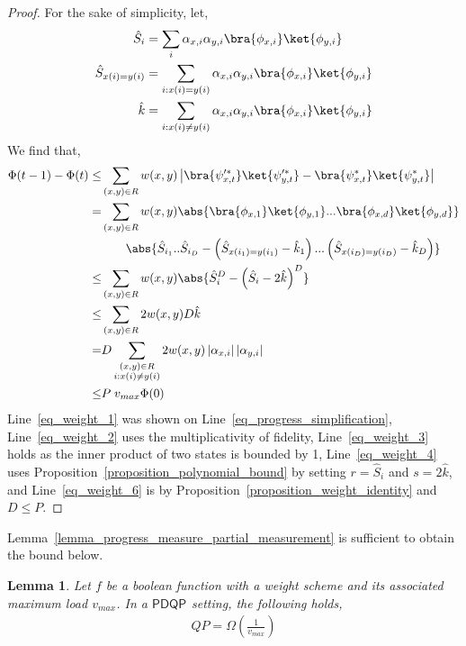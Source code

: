 \documentclass[10pt,a4paper]{article}
\newcommand{\abilityamount}[0]{\ensuremath{P}\xspace} %
\newcommand{\compclass}[2][]{\ensuremath{\mathsf{#2}^{#1}}\xspace}
\newcommand{\pdqpname}[0]{\compclass{PDQP}}
\newtheorem{lemma}[theorem]{Lemma}
\begin{document}
\begin{proof}
    For the sake of simplicity, let,
    \begin{align*}
        \hat{S}_i &= \sum_{i} \alpha_{x,i}\alpha_{y,i}\bra{\phi_{x,i}}\ket{\phi_{y,i}}\\
        \hat{S}_{x(i)=y(i)} &= \sum_{i:x(i)=y(i) } \alpha_{x,i}\alpha_{y,i}\bra{\phi_{x,i}}\ket{\phi_{y,i}}\\
        \hat{k} &= \sum_{i: x(i)\neq y(i)}\alpha_{x,i}\alpha_{y,i}\bra{\phi_{x,i}}\ket{\phi_{y,i}}
    \end{align*}
    We find that,
    \begin{align}
        \Phi(t-1) - \Phi(t) \leq 
        &\sum_{(x,y)\in R} w(x,y) \left| \bra{\psi_{x,t}^{\prime *}}\ket{\psi_{y,t}^{\prime *}} - \bra{\psi_{x,t}^*}\ket{\psi_{y,t}^*} \right|\label{eq_weight_1}\\
        = &\sum_{(x,y)\in R} w(x,y)\abs{\bra{\phi_{x,1}}\ket{\phi_{y,1}}...\bra{\phi_{x,d}}\ket{\phi_{y,d}}} \notag\\
        &\qquad\abs{ \hat{S}_{i_1}..\hat{S}_{i_D} - \left(\hat{S}_{x(i_1)=y(i_1)} - \hat{k}_1\right)...\left(\hat{S}_{x(i_D) = y(i_D)} - \hat{k}_D\right)} \label{eq_weight_2}\\
        \leq &\sum_{(x,y)\in R} w(x,y)\abs{\hat{S}_i ^D - \left(\hat{S}_i - 2\hat{k}\right)^D } \label{eq_weight_3}\\
        \leq & \sum_{(x,y)\in R} 2 w(x,y) D \hat{k} \label{eq_weight_4}\\
        = & D \sum_{\substack{(x,y)\in R \\ i: x(i)\neq y(i)}} 2 w(x,y) \left|\alpha_{x,i} \right| \left|\alpha_{y,i}\right|\label{eq_weight_5}\\
        \leq & P\; v_{max}\Phi(0)\label{eq_weight_6}
    \end{align}
    Line~\ref{eq_weight_1} was shown on Line~\ref{eq_progress_simplification}, Line~\ref{eq_weight_2} uses the multiplicativity of fidelity, Line~\ref{eq_weight_3} holds as the inner product of two states is bounded by 1, Line~\ref{eq_weight_4} uses Proposition~\ref{proposition_polynomial_bound} by setting $r=\hat{S}_i$ and $s=2\hat{k}$, and Line~\ref{eq_weight_6} is by Proposition~\ref{proposition_weight_identity} and $D\leq \abilityamount$.
    \end{proof}

    Lemma~\ref{lemma_progress_measure_partial_measurement} is sufficient to obtain the bound below.


    \begin{lemma}\label{lemma_weighted_adversary_partial_measurement}
        Let $f$ be a boolean function with a weight scheme and its associated maximum load $v_{max}$. In a \pdqpname setting, the following holds,
        \begin{align*}
            QP = \Omega\left(\frac{1}{v_{max}}\right)
        \end{align*}
    \end{lemma}
\end{document}
